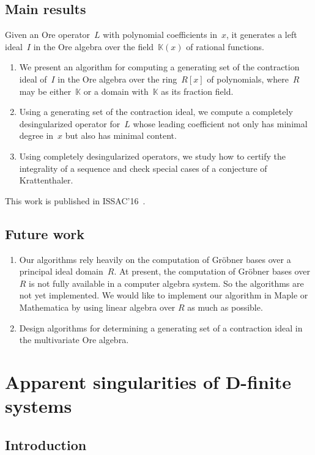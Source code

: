 \documentclass[10pt,a4paper]{article}
\newcommand{\bK}{ {\mathbb  K}}
\begin{document}
\subsection{Main results}
Given an Ore operator~$L$ with polynomial coefficients in~$x$, it generates a left ideal~$I$ in the Ore algebra
over the field~$\bK(x)$ of rational functions. 

\begin{enumerate}
 \item We present an algorithm for computing a generating set of the contraction ideal of~$I$
in the Ore algebra over the ring~$R[x]$ of polynomials, where~$R$ may be either~$\bK$ or a domain with~$\bK$ as its fraction field.
 \item Using a generating set of the contraction ideal,
we compute a completely desingularized operator for~$L$ whose leading coefficient not only
has minimal degree in~$x$ but also has minimal content.
 \item Using completely desingularized operators, we study how to certify the integrality of a sequence and 
 check special cases of a conjecture of Krattenthaler.
\end{enumerate} 

This work is published in ISSAC'16~\cite{Zhang2016}.

\subsection{Future work}

\begin{enumerate}
 \item Our algorithms rely heavily on the computation of Gr\"{o}bner bases over a principal ideal domain~$R$.
At present, the computation of Gr\"{o}bner bases over $R$ is not fully available in a computer algebra system. 
So the algorithms are not yet implemented. We would like to implement our algorithm in Maple or Mathematica 
by using linear algebra over $R$ as much as possible.
 \item Design algorithms for determining a generating set of a contraction ideal in the multivariate Ore algebra.
\end{enumerate}

\section{Apparent singularities of D-finite systems} \label{SECT:apparent}

\subsection{Introduction}
\end{document}
